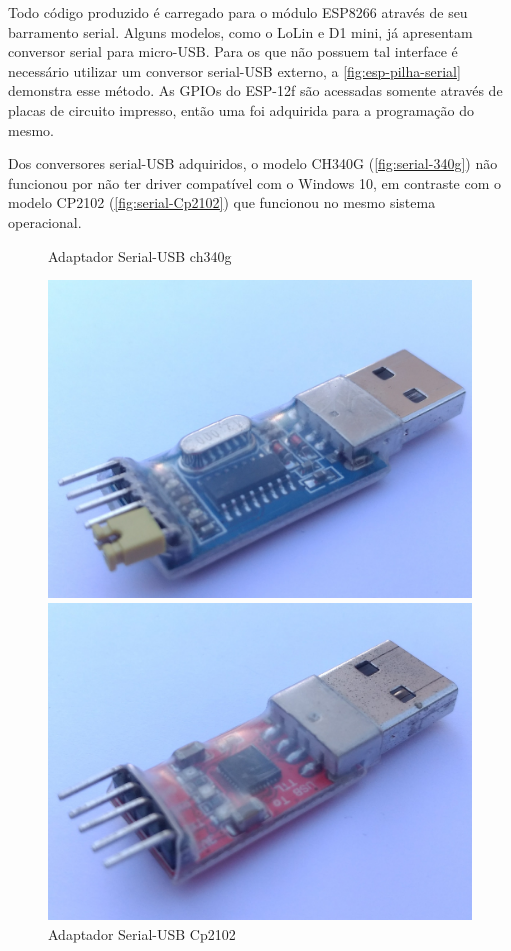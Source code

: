 \FloatBarrier

Todo código produzido é carregado para o módulo ESP8266 através de seu
barramento serial. Alguns modelos, como o LoLin e D1 mini, já apresentam
conversor serial para micro-USB. Para os que não possuem tal interface é
necessário utilizar um conversor serial-USB externo, a
\autoref{fig:esp-pilha-serial} demonstra esse método. As GPIOs do ESP-12f são
acessadas somente através de placas de circuito impresso, então uma foi
adquirida para a programação do mesmo.

Dos conversores serial-USB adquiridos, o modelo CH340G
(\autoref{fig:serial-340g}) não funcionou por não ter driver compatível com o
Windows 10, em contraste com o modelo CP2102 (\autoref{fig:serial-Cp2102}) que
funcionou no mesmo sistema operacional.


\begin{figure}[htb]
	\centering
	\begin{minipage}{0.49\textwidth}
		\centering
		\caption{Adaptador Serial-USB ch340g \label{fig:serial-340g}}
		\includegraphics[width=1\textwidth]{041-esp8266/img/serial-ch340g.jpg}
	\end{minipage}
	\hfill
	\begin{minipage}{0.49\textwidth}
		\centering
		\caption{Adaptador Serial-USB Cp2102 \label{fig:serial-Cp2102}}
		\includegraphics[width=1\textwidth]{041-esp8266/img/serial-Cp2102.jpg}

\end{minipage}
\end{figure}
